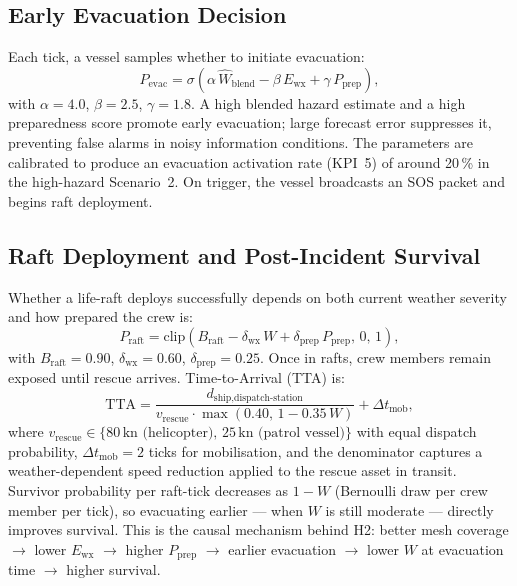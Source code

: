 \documentclass[cameraready]{Interspeech}
\begin{document}
\subsection{Early Evacuation Decision}

Each tick, a vessel samples whether to initiate evacuation:
%
\begin{equation}
  P_\text{evac} = \sigma\left(
    \alpha\,\hat{W}_\text{blend}
    - \beta\,E_\text{wx}
    + \gamma\,P_\text{prep}
  \right),
  \label{eq:evac}
\end{equation}
%
with $\alpha = 4.0$, $\beta = 2.5$, $\gamma = 1.8$. A high blended hazard estimate and a high preparedness score promote early evacuation; large forecast error suppresses it, preventing false alarms in noisy information conditions. The parameters are calibrated to produce an evacuation activation rate (KPI~5) of around 20\,\% in the high-hazard Scenario~2. On trigger, the vessel broadcasts an SOS packet and begins raft deployment.

\subsection{Raft Deployment and Post-Incident Survival}

Whether a life-raft deploys successfully depends on both current weather severity and how prepared the crew is:
%
\begin{equation}
  P_\text{raft} = \text{clip}\left(
    B_\text{raft} - \delta_\text{wx}\,W + \delta_\text{prep}\,P_\text{prep},
    \,0,\,1\right),
  \label{eq:raft}
\end{equation}
%
with $B_\text{raft} = 0.90$, $\delta_\text{wx} = 0.60$, $\delta_\text{prep} = 0.25$. Once in rafts, crew members remain exposed until rescue arrives. Time-to-Arrival (TTA) is:
%
\begin{equation}
  \text{TTA} = \frac{d_\text{ship,dispatch-station}}{v_\text{rescue} \cdot \max(0.40,\,1-0.35\,W)}
               + \Delta t_\text{mob},
  \label{eq:tta}
\end{equation}
%
where $v_\text{rescue} \in \{80\,\text{kn (helicopter)},\,25\,\text{kn (patrol vessel)}\}$ with equal dispatch probability, $\Delta t_\text{mob} = 2$ ticks for mobilisation, and the denominator captures a weather-dependent speed reduction applied to the rescue asset in transit. Survivor probability per raft-tick decreases as $1 - W$ (Bernoulli draw per crew member per tick), so evacuating earlier — when $W$ is still moderate — directly improves survival. This is the causal mechanism behind H2: better mesh coverage $\to$ lower $E_\text{wx}$ $\to$ higher $P_\text{prep}$ $\to$ earlier evacuation $\to$ lower $W$ at evacuation time $\to$ higher survival.
\end{document}
